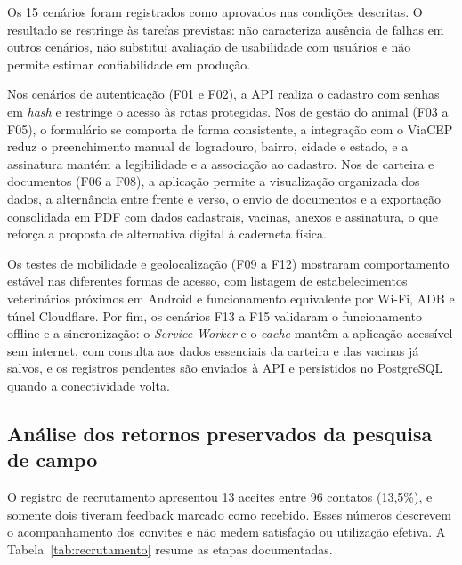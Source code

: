 \documentclass{UNESC}
\begin{document}
Os 15 cenários foram registrados como aprovados nas condições descritas. O resultado se restringe às tarefas previstas: não caracteriza ausência de falhas em outros cenários, não substitui avaliação de usabilidade com usuários e não permite estimar confiabilidade em produção.

Nos cenários de autenticação (F01 e F02), a API realiza o cadastro com senhas em \textit{hash} e restringe o acesso às rotas protegidas. Nos de gestão do animal (F03 a F05), o formulário se comporta de forma consistente, a integração com o ViaCEP reduz o preenchimento manual de logradouro, bairro, cidade e estado, e a assinatura mantém a legibilidade e a associação ao cadastro. Nos de carteira e documentos (F06 a F08), a aplicação permite a visualização organizada dos dados, a alternância entre frente e verso, o envio de documentos e a exportação consolidada em PDF com dados cadastrais, vacinas, anexos e assinatura, o que reforça a proposta de alternativa digital à caderneta física.

Os testes de mobilidade e geolocalização (F09 a F12) mostraram comportamento estável nas diferentes formas de acesso, com listagem de estabelecimentos veterinários próximos em Android e funcionamento equivalente por Wi-Fi, ADB e túnel Cloudflare. Por fim, os cenários F13 a F15 validaram o funcionamento offline e a sincronização: o \textit{Service Worker} e o \textit{cache} mantêm a aplicação acessível sem internet, com consulta aos dados essenciais da carteira e das vacinas já salvos, e os registros pendentes são enviados à API e persistidos no PostgreSQL quando a conectividade volta.

\subsection{Análise dos retornos preservados da pesquisa de campo}

O registro de recrutamento apresentou 13 aceites entre 96 contatos (13,5\%), e somente dois tiveram feedback marcado como recebido. Esses números descrevem o acompanhamento dos convites e não medem satisfação ou utilização efetiva. A Tabela~\ref{tab:recrutamento} resume as etapas documentadas.
\end{document}
